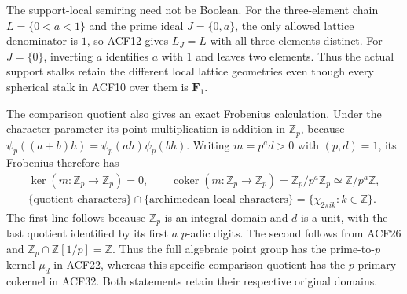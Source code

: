 The support-local semiring need not be Boolean. For the three-element
chain $L=\{0<a<1\}$ and the prime ideal $J=\{0,a\}$, the only
allowed lattice denominator is $1$, so ACF12 gives $L_J=L$ with all
three elements distinct. For $J=\{0\}$, inverting $a$ identifies $a$
with $1$ and leaves two elements. Thus the actual support stalks retain
the different local lattice geometries even though every spherical
stalk in ACF10 over them is $\mathbf F_1$.

The comparison quotient also gives an exact Frobenius calculation.
Under the character parameter its point multiplication is addition in
$\mathbb Z_p$, because $\psi_p((a+b)h)=\psi_p(ah)\psi_p(bh)$.
Writing $m=p^a d>0$ with $(p,d)=1$, its Frobenius therefore has
\begin{equation}\tag{ACF32}
 \begin{gathered}
 \ker(m:\mathbb Z_p\to\mathbb Z_p)=0,\qquad
 \operatorname{coker}(m:\mathbb Z_p\to\mathbb Z_p)
                   =\mathbb Z_p/p^a\mathbb Z_p
                   \simeq\mathbb Z/p^a\mathbb Z,\\
 \{\text{quotient characters}\}\cap\{\text{archimedean local characters}\}
       =\{\chi_{2\pi i k}:k\in\mathbb Z\}.
 \end{gathered}
\end{equation}
The first line follows because $\mathbb Z_p$ is an integral domain and
$d$ is a unit, with the last quotient identified by its first $a$
$p$-adic digits. The second follows from ACF26 and
$\mathbb Z_p\cap\mathbb Z[1/p]=\mathbb Z$. Thus the full algebraic
point group has the prime-to-$p$ kernel $\mu_d$ in ACF22, whereas this
specific comparison quotient has the $p$-primary cokernel in ACF32.
Both statements retain their respective original domains.

